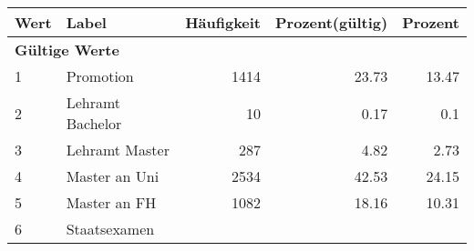      \begin{longtable}{lXrrr}
     \toprule
     \textbf{Wert} & \textbf{Label} & \textbf{Häufigkeit} & \textbf{Prozent(gültig)} & \textbf{Prozent} \\
     \endhead
     \midrule
     \multicolumn{5}{l}{\textbf{Gültige Werte}}\\

     1 &
     \multicolumn{1}{X}{ Promotion   } &


       \num{1414} &
       \num[round-mode=places,round-precision=2]{23.73} &
         \num[round-mode=places,round-precision=2]{13.47} \\

     2 &
     \multicolumn{1}{X}{ Lehramt Bachelor   } &


       \num{10} &
       \num[round-mode=places,round-precision=2]{0.17} &
         \num[round-mode=places,round-precision=2]{0.1} \\

     3 &
     \multicolumn{1}{X}{ Lehramt Master   } &


       \num{287} &
       \num[round-mode=places,round-precision=2]{4.82} &
         \num[round-mode=places,round-precision=2]{2.73} \\

     4 &
     \multicolumn{1}{X}{ Master an Uni   } &


       \num{2534} &
       \num[round-mode=places,round-precision=2]{42.53} &
         \num[round-mode=places,round-precision=2]{24.15} \\

     5 &
     \multicolumn{1}{X}{ Master an FH   } &


       \num{1082} &
       \num[round-mode=places,round-precision=2]{18.16} &
         \num[round-mode=places,round-precision=2]{10.31} \\

     6 &
     \multicolumn{1}{X}{ Staatsexamen   } &



\end{longtable}
